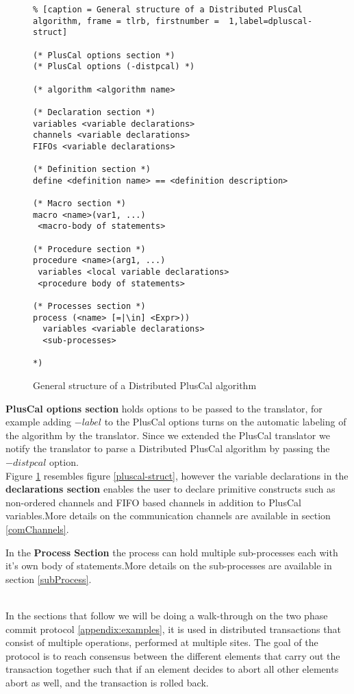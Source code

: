 \documentclass{thesul}
\begin{document}
\begin{figure}
\begin{lstlisting}% [caption = General structure of a Distributed PlusCal algorithm, frame = tlrb, firstnumber =  1,label=dpluscal-struct]

(* PlusCal options section *)
(* PlusCal options (-distpcal) *)

(* algorithm <algorithm name>

(* Declaration section *)
variables <variable declarations>
channels <variable declarations>
FIFOs <variable declarations>

(* Definition section *)
define <definition name> == <definition description>

(* Macro section *)
macro <name>(var1, ...)
 <macro-body of statements>

(* Procedure section *)
procedure <name>(arg1, ...)
 variables <local variable declarations>
 <procedure body of statements>

(* Processes section *)
process (<name> [=|\in] <Expr>))
  variables <variable declarations>
  <sub-processes>

*)

\end{lstlisting}
\caption{General structure of a Distributed PlusCal algorithm}
\label{dpluscal-struct}
\end{figure}

\textbf{PlusCal options section} holds options to be passed to the translator, for example adding $-label$ to the PlusCal options turns on the automatic labeling of the algorithm by the translator. Since we extended the PlusCal translator we notify the translator to parse a Distributed PlusCal algorithm by passing the $-distpcal$ option.\\

Figure \ref{dpluscal-struct} resembles figure \ref{pluscal-struct}, however the variable declarations in the \textbf{declarations section} enables the user to declare primitive constructs such as non-ordered channels and FIFO based channels in addition to PlusCal variables.More details on the communication channels are available in section \ref{comChannels}.

In the \textbf{Process Section} the process can hold multiple sub-processes each with it's own body of statements.More details on the sub-processes are available in section \ref{subProcess}.


\hfill\\
In the sections that follow we will be doing a walk-through on the two phase commit protocol \ref{appendix:examples}, it is used in distributed transactions that consist of multiple operations, performed at multiple sites. The goal of the protocol is to reach consensus between the different elements that carry out the transaction together such that if an element decides to abort all other elements abort as well, and the transaction is rolled back.
\end{document}
